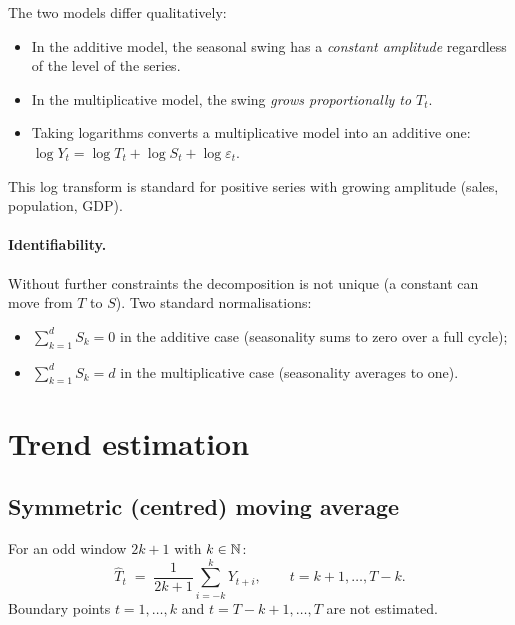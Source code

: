 \begin{rembox}
The two models differ qualitatively:
\begin{itemize}
  \item In the additive model, the seasonal swing has a
        \emph{constant amplitude} regardless of the level of the series.
  \item In the multiplicative model, the swing \emph{grows
        proportionally to $T_t$}.
  \item Taking logarithms converts a multiplicative model into an
        additive one:
        $\log Y_t = \log T_t + \log S_t + \log \varepsilon_t$.
\end{itemize}
This log transform is standard for positive series with growing
amplitude (sales, population, GDP).
\end{rembox}

\paragraph{Identifiability.} Without further constraints the
decomposition is not unique (a constant can move from $T$ to $S$).
Two standard normalisations:
\begin{itemize}
  \item $\sum_{k = 1}^{d} S_k = 0$ in the additive case (seasonality
        sums to zero over a full cycle);
  \item $\sum_{k = 1}^{d} S_k = d$ in the multiplicative case
        (seasonality averages to one).
\end{itemize}

\section{Trend estimation}
\label{sec:trend}

\subsection{Symmetric (centred) moving average}

\begin{defbox}
\label{def:ma}
For an odd window $2k + 1$ with $k \in \mathbb{N}$:
\[
  \widehat{T}_t \;=\; \frac{1}{2k + 1}\sum_{i=-k}^{k} Y_{t+i},
  \qquad t = k+1, \dots, T - k.
\]
Boundary points $t = 1, \dots, k$ and $t = T - k + 1, \dots, T$ are
not estimated.
\end{defbox}


